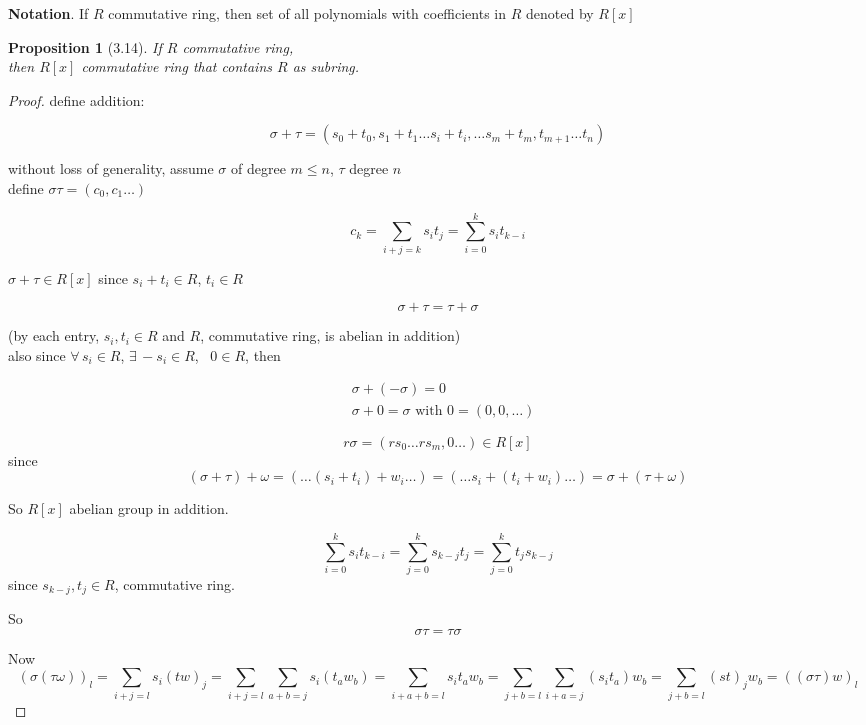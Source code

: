 \documentclass[twoside,landscape]{amsart}
\theoremstyle{plain}
\newtheorem{proposition}{Proposition}
\theoremstyle{definition}
\theoremstyle{remark}
\begin{document}
\begin{multicols*}{2}
\textbf{Notation}.  If $R$ commutative ring, then set of all polynomials with coefficients in $R$ denoted by $R[x]$

\begin{proposition}[3.14] 
  If $R$ commutative ring, \\
then $R[x]$ commutative ring that contains $R$ as subring.
\end{proposition}

\begin{proof} 
define addition: 

\[
\sigma + \tau = (s_0 + t_0 , s_1 + t_1  \dots s_i + t_i , \dots s_m + t_m , t_{m+1} \dots t_n )
\]

without loss of generality, assume $\sigma $ of degree $m \leq n$, $\tau$ degree $n$  \\

define $\sigma \tau = (c_0, c_1 \dots )$ 

\[
c_k = \sum_{i+j =k } s_i t_j = \sum_{i=0}^k s_i t_{k-i}
\]

$\sigma + \tau \in R[x]$ since $s_i + t_i \in R$, $t_i \in R$

\[
\sigma + \tau = \tau + \sigma
\]

(by each entry, $s_i, t_i \in R$ and $R$, commutative ring, is abelian in addition) \\

also since $\forall \, s_i \in R$, $\exists \, -s_i \in R$, \, $0 \in R$, then 

\[
\begin{aligned}
  & \sigma + (- \sigma) = 0 \\ 
  &  \sigma + 0 = \sigma \text{ with } 0 = (0,0, \dots )
\end{aligned}
\]

\[
r\sigma = (rs_0 \dots rs_m , 0 \dots ) \in R[x]  
\]
since 
\[
(\sigma + \tau ) + \omega = ( \dots (s_i + t_i ) + w_i \dots ) = ( \dots s_i + (t_i + w_i ) \dots ) = \sigma + (\tau + \omega )
\]

So $R[x]$ abelian group in addition.

\[
\sum_{i=0}^k s_i t_{k-i} = \sum_{j=0}^k s_{k-j} t_j = \sum_{j=0}^k t_j s_{k-j} 
\]
since $s_{k-j}, t_j \in R$, commutative ring.  

So
\[
\sigma \tau = \tau \sigma
\]

Now
\[
(\sigma (\tau \omega) )_l = \sum_{i+j = l } s_i (tw)_j = \sum_{i+j = l } \sum_{a+b= j} s_i (t_a w_b) = \sum_{ i + a+ b = l } s_i t_a w_b = \sum_{ j +b = l } \sum_{i + a =j } (s_it_a) w_b = \sum_{j+b =l } (st)_j w_b = ((\sigma \tau)w)_l
\]


\end{proof}
\end{multicols*}
\end{document}
